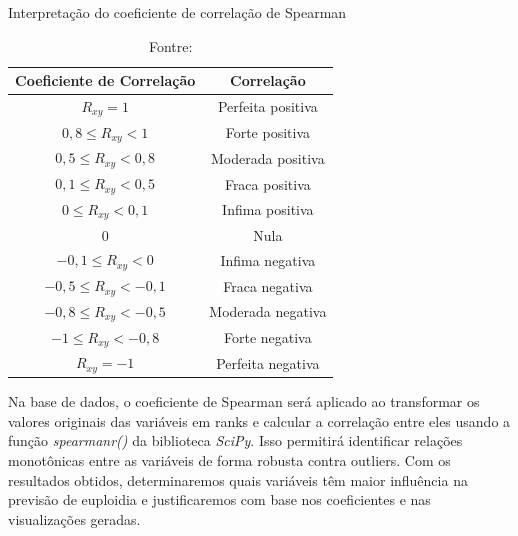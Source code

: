 \begin{apendicesenv}
\begin{table}[h!]
  \centering
  \caption{\scriptsize Interpretação do coeficiente de correlação de Spearman}
  \label{tab:correlacao_pearson}
  \begin{tabular}{|c|c|}
  \hline
  \vspace{0.2cm} \cellcolor[HTML]{C0C0C0} \textbf{Coeficiente de Correlação} & \cellcolor[HTML]{C0C0C0} \textbf{Correlação} \\
  \hline
  $R_{xy} = 1$ & Perfeita positiva \\
  \hline
  $0,8 \leq R_{xy} < 1$ & Forte positiva \\
  \hline
  $0,5 \leq R_{xy} < 0,8$ & Moderada positiva \\
  \hline
  $0,1 \leq R_{xy} < 0,5$ & Fraca positiva \\
  \hline
  $0 \leq R_{xy} < 0,1$ & Infima positiva \\
  \hline
  $0$ & Nula \\
  \hline
  $-0,1 \leq R_{xy} < 0$ & Infima negativa \\
  \hline
  $-0,5 \leq R_{xy} < -0,1$ & Fraca negativa \\
  \hline
  $-0,8 \leq R_{xy} < -0,5$ & Moderada negativa \\
  \hline
  $-1 \leq R_{xy} < -0,8$ & Forte negativa \\
  \hline
  $R_{xy} = -1$ & Perfeita negativa \\
  \hline
  \end{tabular}
  \caption*{\scriptsize Fontre: \cite{santos2007}}
\end{table}

Na base de dados, o coeficiente de Spearman será aplicado ao transformar os valores originais das variáveis em ranks e calcular a correlação entre eles usando a função \textit{spearmanr()} da biblioteca \textit{SciPy}. Isso permitirá identificar relações monotônicas entre as variáveis de forma robusta contra outliers. Com os resultados obtidos, determinaremos quais variáveis têm maior influência na previsão de euploidia e justificaremos com base nos coeficientes e nas visualizações geradas.

\end{apendicesenv}
